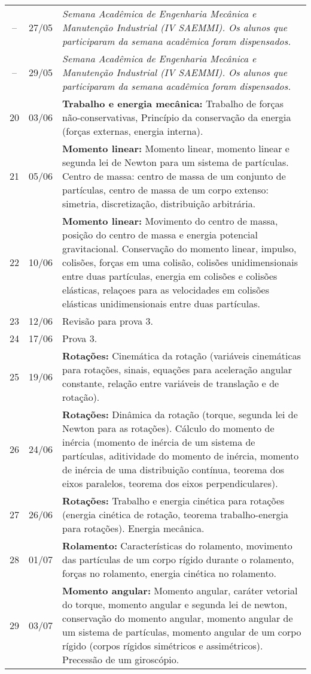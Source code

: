 \begin{center}
\begin{longtable}{ccp{70mm}}
 -- & 27/05 & \textit{Semana Acadêmica de Engenharia Mecânica e Manutenção Industrial (IV SAEMMI). Os alunos que participaram da semana acadêmica foram dispensados.} \\
 -- & 29/05 & \textit{Semana Acadêmica de Engenharia Mecânica e Manutenção Industrial (IV SAEMMI). Os alunos que participaram da semana acadêmica foram dispensados.} \\
 20 & 03/06 & \textbf{Trabalho e energia mecânica:} Trabalho de forças não-conservativas, Princípio da conservação da energia (forças externas, energia interna). \\
 21 & 05/06 & \textbf{Momento linear:} Momento linear, momento linear e segunda lei de Newton para um sistema de partículas. Centro de massa: centro de massa de um conjunto de partículas, centro de massa de um corpo extenso: simetria, discretização, distribuição arbitrária. \\ 
 22 & 10/06 & \textbf{Momento linear:} Movimento do centro de massa, posição do centro de massa e energia potencial gravitacional. Conservação do momento linear, impulso, colisões, forças em uma colisão, colisões unidimensionais entre duas partículas, energia em colisões e colisões elásticas, relaçoes para as velocidades em colisões elásticas unidimensionais entre duas partículas. \\
 23 & 12/06 & Revisão para prova 3. \\
 24 & 17/06 & Prova 3. \\
 25 & 19/06 & \textbf{Rotações:} Cinemática da rotação (variáveis cinemáticas para rotações, sinais, equações para aceleração angular constante, relação entre variáveis de translação e de rotação). \\
 26 & 24/06 & \textbf{Rotações:} Dinâmica da rotação (torque, segunda lei de Newton para as rotações). Cálculo do momento de inércia (momento de inércia de um sistema de partículas, aditividade do momento de inércia, momento de inércia de uma distribuição contínua, teorema dos eixos paralelos, teorema dos eixos perpendiculares). \\
 27 & 26/06 & \textbf{Rotações:} Trabalho e energia cinética para rotações (energia cinética de rotação, teorema trabalho-energia para rotações). Energia mecânica.\\
 28 & 01/07 & \textbf{Rolamento:} Características do rolamento, movimento das partículas de um corpo rígido durante o rolamento, forças no rolamento, energia cinética no rolamento.\\
 29 & 03/07 & \textbf{Momento angular:} Momento angular, caráter vetorial do torque, momento angular e segunda lei de newton, conservação do momento angular, momento angular de um sistema de partículas, momento angular de um corpo rígido (corpos rígidos simétricos e assimétricos). Precessão de um giroscópio.\\

\end{longtable}
\end{center}
